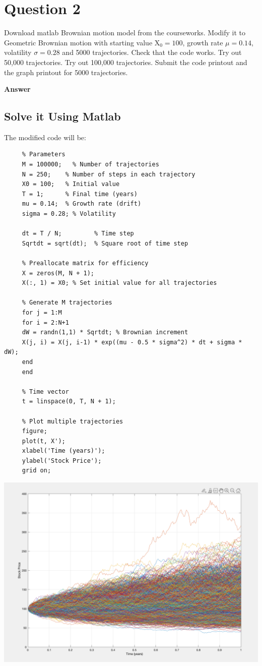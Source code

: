 \documentclass[letterpaper]{article}
\begin{document}
		\section{Question 2}
		Download matlab Brownian motion model from the courseworks. Modify it to Geometric Brownian motion with starting value $\mathrm{X_0}=100$, growth rate $\mu=0.14$, volatility $\sigma=0.28$ and 5000 trajectories. Check that the code works. Try out 50,000 trajectories. Try out 100,000 trajectories. Submit the code printout and the graph printout for 5000 trajectories.
		
		\textbf{Answer}
		\subsection{Solve it Using Matlab}
		
		The modified code will be:
		
		\begin{lstlisting}
     % Parameters
     M = 100000;   % Number of trajectories
     N = 250;    % Number of steps in each trajectory
     X0 = 100;   % Initial value
     T = 1;      % Final time (years)
     mu = 0.14;  % Growth rate (drift)
     sigma = 0.28; % Volatility
     
     dt = T / N;         % Time step
     Sqrtdt = sqrt(dt);  % Square root of time step
     
     % Preallocate matrix for efficiency
     X = zeros(M, N + 1);
     X(:, 1) = X0; % Set initial value for all trajectories
     
     % Generate M trajectories
     for j = 1:M
     for i = 2:N+1
     dW = randn(1,1) * Sqrtdt; % Brownian increment
     X(j, i) = X(j, i-1) * exp((mu - 0.5 * sigma^2) * dt + sigma * dW);
     end
     end
     
     % Time vector
     t = linspace(0, T, N + 1);
     
     % Plot multiple trajectories
     figure;
     plot(t, X');
     xlabel('Time (years)');
     ylabel('Stock Price');
     grid on; \end{lstlisting}
 
		\includegraphics[max width=\textwidth, center]{Q2_5000}
		
\end{document}
